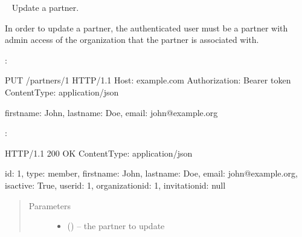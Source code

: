 \documentclass[letterpaper,10pt,english]{sphinxmanual}
\begin{document}
\begin{DUlineblock}{0em}
\item[] 
\end{DUlineblock}


\begin{fulllineitems}
\label{\detokenize{resources/partner:put--partners-(partner_id)}}~
Update a partner.

In order to update a partner, the authenticated user must be a partner
with admin access of the organization that the partner is associated
with.

:

\begin{sphinxVerbatim}[commandchars=\\\{\}]
PUT /partners/1 HTTP/1.1
Host: example.com
Authorization: Bearer \PYGZlt{}token\PYGZgt{}
Content\PYGZhy{}Type: application/json

\PYGZob{}
    \PYGZsq{}firstname\PYGZsq{}: \PYGZsq{}John\PYGZsq{},
    \PYGZsq{}lastname\PYGZsq{}: \PYGZsq{}Doe\PYGZsq{},
    \PYGZsq{}email\PYGZsq{}: \PYGZsq{}john@example.org\PYGZsq{}
\PYGZcb{}
\end{sphinxVerbatim}

:

\begin{sphinxVerbatim}[commandchars=\\\{\}]
HTTP/1.1 200 OK
Content\PYGZhy{}Type: application/json

\PYGZob{}
    \PYGZsq{}id\PYGZsq{}: 1,
    \PYGZsq{}type\PYGZsq{}: \PYGZsq{}member\PYGZsq{},
    \PYGZsq{}firstname\PYGZsq{}: \PYGZsq{}John\PYGZsq{},
    \PYGZsq{}lastname\PYGZsq{}: \PYGZsq{}Doe\PYGZsq{},
    \PYGZsq{}email\PYGZsq{}: \PYGZsq{}john@example.org\PYGZsq{},
    \PYGZsq{}is\PYGZus{}active\PYGZsq{}: True,
    \PYGZsq{}user\PYGZus{}id\PYGZsq{}: 1,
    \PYGZsq{}organization\PYGZus{}id\PYGZsq{}: 1,
    \PYGZsq{}invitation\PYGZus{}id\PYGZsq{}: null
\PYGZcb{}
\end{sphinxVerbatim}
\begin{quote}\begin{description}
\item[{Parameters}] \leavevmode\begin{itemize}
\item {} 
 () -- the partner to update


\end{itemize}
\end{description}
\end{quote}
\end{fulllineitems}
\end{document}
